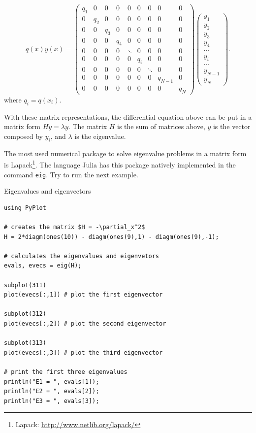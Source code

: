\begin{equation}
q(x)y(x) = 
\begin{pmatrix}
 q_1 & 0 & 0 & 0 & 0 & 0 & 0 & 0 & 0\\
 0 & q_2 & 0 & 0 & 0 & 0 & 0 & 0 & 0\\
 0 & 0 & q_3 & 0 & 0 & 0 & 0 & 0 & 0\\
 0 & 0 & 0 & q_4 & 0 & 0 & 0 & 0 & 0\\
 0 & 0 & 0 & 0 & \ddots & 0 & 0 & 0 & 0\\
 0 & 0 & 0 & 0 & 0 & q_i & 0 & 0 & 0\\
 0 & 0 & 0 & 0 & 0 & 0 & \ddots & 0 & 0\\
 0 & 0 & 0 & 0 & 0 & 0 & 0 & q_{N-1} & 0\\
 0 & 0 & 0 & 0 & 0 & 0 & 0 & 0 & q_N
\end{pmatrix}
\begin{pmatrix}
  y_1 \\y_2 \\ y_3 \\ y_4 \\ \cdots \\ y_i \\ \cdots \\ y_{N-1} \\ y_N
\end{pmatrix}.
\end{equation}
where $q_i = q(x_i)$.

With these matrix representations, the differential equation above can be put in a matrix form $H y = \lambda y$. The matrix $H$ is the sum of matrices above, $y$ is the vector composed by $y_i$, and $\lambda$ is the eigenvalue.

The most used numerical package to solve eigenvalue problems in a matrix form is Lapack\footnote{Lapack: \url{http://www.netlib.org/lapack/}}. The language Julia has this package natively implemented in the command \texttt{eig}. Try to run the next example.

\begin{example}{Eigenvalues and eigenvectors}
\label{ex:eig}
\begin{verbatim}
using PyPlot

# creates the matrix $H = -\partial_x^2$
H = 2*diagm(ones(10)) - diagm(ones(9),1) - diagm(ones(9),-1);

# calculates the eigenvalues and eigenvetors
evals, evecs = eig(H);

subplot(311)
plot(evecs[:,1]) # plot the first eigenvector

subplot(312)
plot(evecs[:,2]) # plot the second eigenvector

subplot(313)
plot(evecs[:,3]) # plot the third eigenvector

# print the first three eigenvalues
println("E1 = ", evals[1]);
println("E2 = ", evals[2]);
println("E3 = ", evals[3]);

\end{verbatim}
\end{example}

